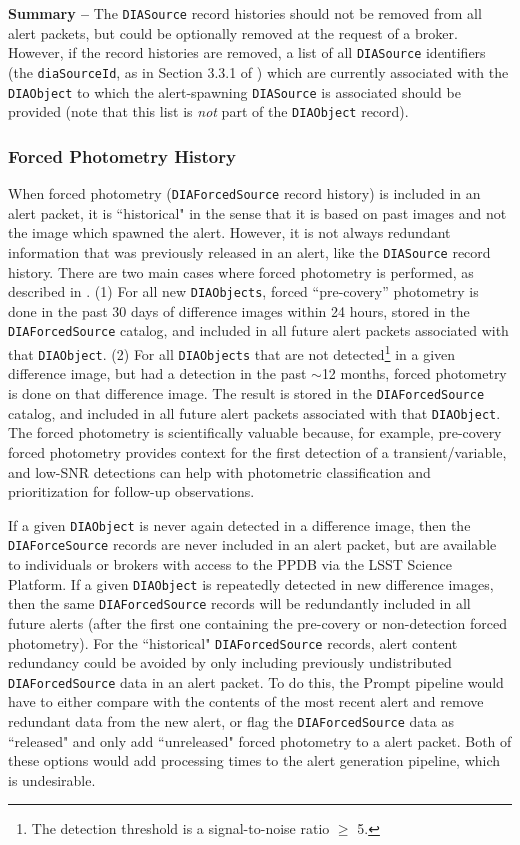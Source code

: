 \documentclass[DM,lsstdraft,authoryear,toc]{lsstdoc}
\begin{document}
{\bf Summary --} The {\tt DIASource} record histories should not be removed from all alert packets, but could be optionally removed at the request of a broker. However, if the record histories are removed, a list of all {\tt DIASource} identifiers (the {\tt diaSourceId}, as in Section 3.3.1 of ) which are currently associated with the {\tt DIAObject} to which the alert-spawning {\tt DIASource} is associated should be provided (note that this list is \emph{not} part of the {\tt DIAObject} record).


\subsubsection{Forced Photometry History}\label{sssec:packets_remove_fp}

When forced photometry ({\tt DIAForcedSource} record history) is included in an alert packet, it is ``historical" in the sense that it is based on past images and not the image which spawned the alert. However, it is not always redundant information that was previously released in an alert, like the {\tt DIASource} record history. There are two main cases where forced photometry is performed, as described in . (1) For all new {\tt DIAObjects}, forced ``pre-covery'' photometry is done in the past 30 days of difference images within 24 hours, stored in the {\tt DIAForcedSource} catalog, and included in all future alert packets associated with that {\tt DIAObject}. (2) For all {\tt DIAObjects} that are not detected\footnote{The detection threshold is a signal-to-noise ratio $\geq$ 5.} in a given difference image, but had a detection in the past $\sim$12 months, forced photometry is done on that difference image. The result is stored in the {\tt DIAForcedSource} catalog, and included in all future alert packets associated with that {\tt DIAObject}. The forced photometry is scientifically valuable because, for example, pre-covery forced photometry provides context for the first detection of a transient/variable, and low-SNR detections can help with photometric classification and prioritization for follow-up observations. 

If a given {\tt DIAObject} is never again detected in a difference image, then the {\tt DIAForceSource} records are never included in an alert packet, but are available to individuals or brokers with access to the PPDB via the LSST Science Platform. If a given {\tt DIAObject} is repeatedly detected in new difference images, then the same {\tt DIAForcedSource} records will be redundantly included in all future alerts (after the first one containing the pre-covery or non-detection forced photometry). For the ``historical" {\tt DIAForcedSource} records, alert content redundancy could be avoided by only including previously undistributed {\tt DIAForcedSource} data in an alert packet. To do this, the Prompt pipeline would have to either compare with the contents of the most recent alert and remove redundant data from the new alert, or flag the {\tt DIAForcedSource} data as ``released" and only add ``unreleased" forced photometry to a alert packet. Both of these options would add processing times to the alert generation pipeline, which is undesirable.
\end{document}
